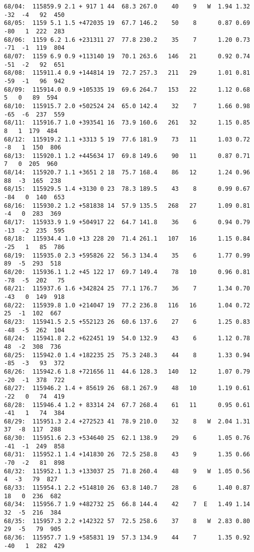 {\begin{verbatim}
68/04:  115859.9 2.1 + 917 1 44  68.3 267.0    40    9   W  1.94 1.32 -32  -4   92  450 
68/05:  1159 5.1 1.5 +472035 19  67.7 146.2    50    8      0.87 0.69 -80   1  222  283 
68/06:  1159 6.2 1.6 +231311 27  77.8 230.2    35    7      1.20 0.73 -71  -1  119  804 
68/07:  1159 6.9 0.9 +113140 19  70.1 263.6   146   21      0.92 0.74 -51  -2   92  651 
68/08:  115911.4 0.9 +144814 19  72.7 257.3   211   29      1.01 0.81 -59  -1   96  942 
68/09:  115914.0 0.9 +105335 19  69.6 264.7   153   22      1.12 0.68   5   0   89  594 
68/10:  115915.7 2.0 +502524 24  65.0 142.4    32    7      1.66 0.98 -65  -6  237  559 
68/11:  115916.7 1.0 +393541 16  73.9 160.6   261   32      1.15 0.85   8   1  179  484 
68/12:  115919.2 1.1 +3313 5 19  77.6 181.9    73   11      1.03 0.72  -8   1  150  806 
68/13:  115920.1 1.2 +445634 17  69.8 149.6    90   11      0.87 0.71   7   0  205  960 
68/14:  115920.7 1.1 +3651 2 18  75.7 168.4    86   12      1.24 0.96  88  -3  165  238 
68/15:  115929.5 1.4 +3130 0 23  78.3 189.5    43    8      0.99 0.67 -84   0  140  653 
68/16:  115930.2 1.2 +581838 14  57.9 135.5   268   27      1.09 0.81  -4   0  283  369 
68/17:  115933.9 1.9 +504917 22  64.7 141.8    36    6      0.94 0.79 -13  -2  235  595 
68/18:  115934.4 1.0 +13 228 20  71.4 261.1   107   16      1.15 0.84 -25   1   85  786 
68/19:  115935.0 2.3 +595826 22  56.3 134.4    35    6      1.77 0.99  89  -5  293  518 
68/20:  115936.1 1.2 +45 122 17  69.7 149.4    78   10      0.96 0.81 -78  -5  202   75 
68/21:  115937.6 1.6 +342824 25  77.1 176.7    36    7      1.34 0.70 -43   0  149  918 
68/22:  115939.8 1.0 +214047 19  77.2 236.8   116   16      1.04 0.72  25  -1  102  667 
68/23:  115941.5 2.5 +552123 26  60.6 137.6    27    6      1.25 0.83 -48  -5  262  104 
68/24:  115941.8 2.2 +622451 19  54.0 132.9    43    6      1.12 0.78  48  -2  308  736 
68/25:  115942.0 1.4 +182235 25  75.3 248.3    44    8      1.33 0.94 -85  -3   93  372 
68/26:  115942.6 1.8 +721656 11  44.6 128.3   140   12      1.07 0.79 -20  -1  378  722 
68/27:  115946.2 1.4 + 85619 26  68.1 267.9    48   10      1.19 0.61 -22   0   74  419 
68/28:  115946.4 1.2 + 83314 24  67.7 268.4    61   11      0.95 0.61 -41   1   74  384 
68/29:  115951.3 2.4 +272523 41  78.9 210.0    32    8   W  2.04 1.31  37  -8  117  288 
68/30:  115951.6 2.3 +534640 25  62.1 138.9    29    6      1.05 0.76 -41  -1  249  858 
68/31:  115952.1 1.4 +141830 26  72.5 258.8    43    9      1.35 0.66 -70  -2   81  898 
68/32:  115952.1 1.3 +133037 25  71.8 260.4    48    9   W  1.05 0.56   4  -3   79  827 
68/33:  115954.1 2.2 +514810 26  63.8 140.7    28    6      1.40 0.87  18   0  236  682 
68/34:  115956.7 1.9 +482732 25  66.8 144.4    42    7  E   1.49 1.14  32  -5  216  384 
68/35:  115957.3 2.2 +142322 57  72.5 258.6    37    8   W  2.83 0.80  29  -5   79  905 
68/36:  115957.7 1.9 +585831 19  57.3 134.9    44    7      1.35 0.92 -40   1  282  429 
\end{verbatim} }


